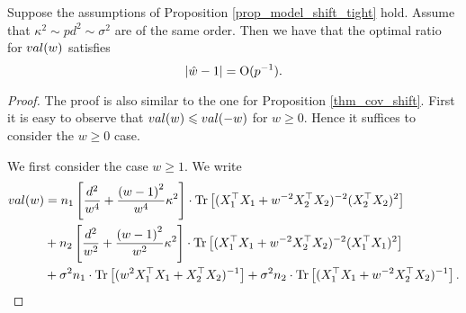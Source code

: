 \begin{lemma} 
Suppose the assumptions of Proposition \ref{prop_model_shift_tight} hold. Assume that $ \kappa^2 \sim pd^2 \sim \sigma^2$ are of the same order. Then we have that the optimal ratio for $val(w)$ satisfies
	$$|\hat w -1|=\operatorname{O}(p^{-1}).$$%
\end{lemma}
\begin{proof}
The proof is also similar to the one for Proposition \ref{thm_cov_shift}. First it is easy to observe that $val(w)\leqslant val(-w)$ for $w\ge 0$. Hence it suffices to consider the $w\ge 0$ case.

We first consider the case $w\ge 1$. We write
\begin{align}
	val(w) &= n_1\left[\frac{d^2}{w^4} +\frac{\left( w-1\right)^2}{w^4}\kappa^2\right]\cdot \operatorname{Tr}\left[( X_1^{\top}X_1 +w^{-2}X_2^{\top}X_2)^{-2} (X_2^{\top}X_2)^2\right] \nonumber \\
	& + n_2\left[\frac{d^2}{w^2} +\frac{\left( w-1\right)^2}{w^2}\kappa^2\right]\cdot \operatorname{Tr}\left[( X_1^{\top}X_1 +w^{-2}X_2^{\top}X_2)^{-2} (X_1^{\top}X_1)^2\right] \nonumber\\
			& + \sigma^2n_1 \cdot \operatorname{Tr}\left[(w^{2}X_1^{\top}X_1  + X_2^{\top}X_2)^{-1} \right] +  \sigma^2n_2 \cdot \operatorname{Tr}\left[(X_1^{\top}X_1  + w^{-2}X_2^{\top}X_2)^{-1} \right]. \nonumber
\end{align}


\end{proof}
